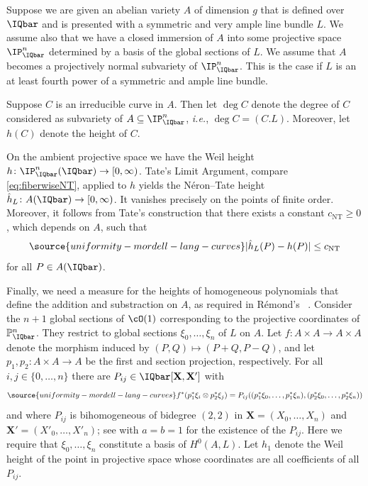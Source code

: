 Suppose we are given an abelian variety $A$ of dimension $g$ that is
defined over $\IQbar$ and is presented with a symmetric and very
ample line bundle $L$. We assume also that we have a closed immersion
of $A$ into some projective space $\IP_\IQbar^n$ determined by a basis
of the global sections of $L$. We assume that $A$ becomes a
projectively normal subvariety of $\IP_\IQbar^n$. This is the case if
$L$ is an at least fourth power of a symmetric and ample line bundle.

Suppose $C$ is an irreducible  curve in $A$. Then let $\deg
C$ denote  the degree of $C$ considered as subvariety of
$A\subseteq \IP_\IQbar^n$, \textit{i.e.}, $\deg C = (C.L)$. Moreover, let $h(C)$
denote the height of $C$.

On the ambient projective space  we have the
 Weil height $h\colon
\IP_\IQbar^n(\IQbar)\rightarrow [0,\infty)$. Tate's Limit Argument,
compare \eqref{eq:fiberwiseNT},
applied to $h$ yields the N\'eron--Tate height $\hat h_L\colon A(\IQbar)\rightarrow
[0,\infty)$. It vanishes precisely on the points of finite order.
Moreover, it follows  from Tate's construction  that
there exists a constant $c_{\mathrm{NT}}\ge 0$, which depends on $A$, such that
\begin{equation}
  \label{def:cNT}
\source{uniformity-mordell-lang-curves}
  |\hat h_{L}(P) - h(P)|\le c_{\mathrm{NT}}
\end{equation}
for all $P\in A(\IQbar)$.

Finally, we need a measure for the heights of homogeneous polynomials that
define the addition and substraction on $A$, as required in R\'emond's
~\cite{remond:vojtasup}. Consider the $n+1$ global sections of $\cO(1)$
corresponding to the projective coordinates of $\mathbb{P}_\IQbar^n$.
They restrict to  global sections $\xi_0,\ldots,\xi_n$ of
$L$ on $A$. Let $f\colon A\times A\rightarrow A\times A$ denote the
morphism induced by $(P,Q)\mapsto (P+Q,P-Q)$, and let $p_1,p_2\colon
A\times A\rightarrow A$ be the first and section projection,
respectively. For all $i,j\in \{0,\ldots,n\}$ there are $P_{ij} \in
\IQbar[\mathbf{X},\mathbf{X}']$ with
\begin{equation}
  \label{eq:Pijforh1}
\source{uniformity-mordell-lang-curves}
  f^*(p_1^*\xi_i\otimes
  p_2^*\xi_j)=P_{ij}((p_1^*\xi_0,\ldots,p_1^*\xi_n),(p_2^*\xi_0,\ldots,p_2^*\xi_n))
\end{equation}
and where $P_{ij}$ is bihomogeneous of bidegree $(2,2)$ in $\mathbf{X}
= (X_0,\ldots,X_n)$ and $\mathbf{X}' = (X'_0,\ldots,X'_n)$; see
 \cite[Proposition~5.2]{remond:vojtasup} with $a=b=1$
for the existence of the $P_{ij}$. Here we require that
$\xi_0,\ldots,\xi_n$ constitute a basis of $H^0(A,L)$. Let $h_1$
denote the Weil height of the point in projective space whose
coordinates are all coefficients of all $P_{ij}$.

